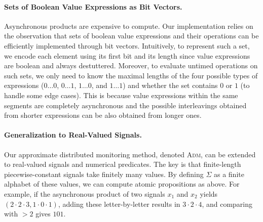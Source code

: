 \documentclass[iicol,lineno]{sn-jnl}
\newcommand\alert[1]{\textcolor{red}{#1}}
\newcommand{\?}{\text{?}}
\begin{document}
	\paragraph*{Sets of Boolean Value Expressions as Bit Vectors.}
	Asynchronous products are expensive to compute.
	Our implementation relies on the observation that sets of boolean value expressions and their operations can be efficiently implemented through bit vectors.
	Intuitively, to represent such a set, we encode each element using its first bit and its length since value expressions are boolean and always destuttered.
	Moreover, to evaluate untimed operations on such sets, we only need to know the maximal lengths of the four possible types of expressions ($0 \ldots 0$, $0 \ldots 1$, $1 \ldots 0$, and $1 \ldots 1$) and whether the set contains $0$ or $1$ (to handle some edge cases).
	This is because value expressions within the same segments are completely asynchronous and the possible interleavings obtained from shorter expressions can be also obtained from longer ones.
	
	\paragraph*{Generalization to Real-Valued Signals.}
	Our approximate distributed monitoring method, denoted \textsc{Adm}, can be extended to real-valued signals and numerical predicates.
	The key is that finite-length piecewise-constant signals take finitely many values.
	By defining $\Sigma$ as a finite alphabet of these values, we can compute atomic propositions as above.
	For example, if the asynchronous product of two signals $x_1$ and $x_2$ yields $(2\cdot2\cdot3, 1\cdot0\cdot1)$, adding these letter-by-letter results in $3 \cdot 2 \cdot 4$, and comparing with $> 2$ gives $101$.
	
\end{document}
